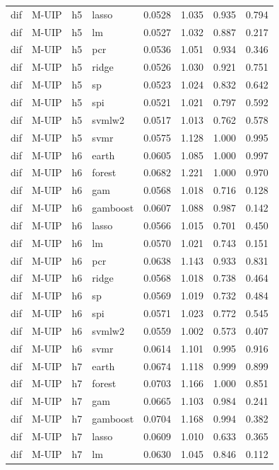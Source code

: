 \begin{ThreePartTable}
\begin{longtable}[t]{llclcccc}
dif & M-UIP & h5 & lasso & 0.0528 & 1.035 & 0.935 & 0.794\\
dif & M-UIP & h5 & lm & 0.0527 & 1.032 & 0.887 & 0.217\\
dif & M-UIP & h5 & pcr & 0.0536 & 1.051 & 0.934 & 0.346\\
dif & M-UIP & h5 & ridge & 0.0526 & 1.030 & 0.921 & 0.751\\
dif & M-UIP & h5 & sp & 0.0523 & 1.024 & 0.832 & 0.642\\
dif & M-UIP & h5 & spi & 0.0521 & 1.021 & 0.797 & 0.592\\
dif & M-UIP & h5 & svmlw2 & 0.0517 & 1.013 & 0.762 & 0.578\\
dif & M-UIP & h5 & svmr & 0.0575 & 1.128 & 1.000 & 0.995\\
\addlinespace
dif & M-UIP & h6 & earth & 0.0605 & 1.085 & 1.000 & 0.997\\
dif & M-UIP & h6 & forest & 0.0682 & 1.221 & 1.000 & 0.970\\
dif & M-UIP & h6 & gam & 0.0568 & 1.018 & 0.716 & 0.128\\
dif & M-UIP & h6 & gamboost & 0.0607 & 1.088 & 0.987 & 0.142\\
dif & M-UIP & h6 & lasso & 0.0566 & 1.015 & 0.701 & 0.450\\
dif & M-UIP & h6 & lm & 0.0570 & 1.021 & 0.743 & 0.151\\
dif & M-UIP & h6 & pcr & 0.0638 & 1.143 & 0.933 & 0.831\\
dif & M-UIP & h6 & ridge & 0.0568 & 1.018 & 0.738 & 0.464\\
dif & M-UIP & h6 & sp & 0.0569 & 1.019 & 0.732 & 0.484\\
dif & M-UIP & h6 & spi & 0.0571 & 1.023 & 0.772 & 0.545\\
dif & M-UIP & h6 & svmlw2 & 0.0559 & 1.002 & 0.573 & 0.407\\
dif & M-UIP & h6 & svmr & 0.0614 & 1.101 & 0.995 & 0.916\\
\addlinespace
dif & M-UIP & h7 & earth & 0.0674 & 1.118 & 0.999 & 0.899\\
dif & M-UIP & h7 & forest & 0.0703 & 1.166 & 1.000 & 0.851\\
dif & M-UIP & h7 & gam & 0.0665 & 1.103 & 0.984 & 0.241\\
dif & M-UIP & h7 & gamboost & 0.0704 & 1.168 & 0.994 & 0.382\\
dif & M-UIP & h7 & lasso & 0.0609 & 1.010 & 0.633 & 0.365\\
dif & M-UIP & h7 & lm & 0.0630 & 1.045 & 0.846 & 0.112\\

\end{longtable}
\end{ThreePartTable}
